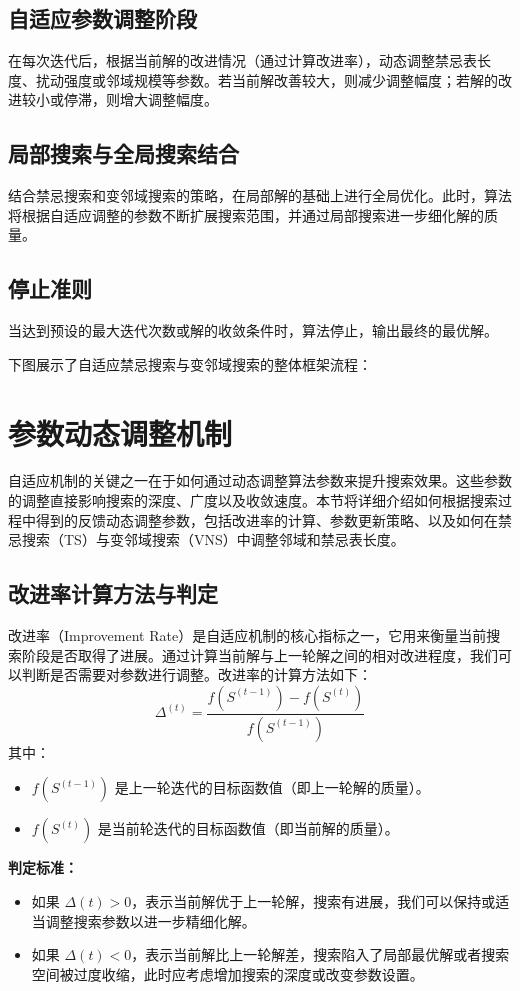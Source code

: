 \documentclass[12pt,a4paper,twoside]{ctexbook}
\begin{document}
\subsection{自适应参数调整阶段}
在每次迭代后，根据当前解的改进情况（通过计算改进率），动态调整禁忌表长度、扰动强度或邻域规模等参数。若当前解改善较大，则减少调整幅度；若解的改进较小或停滞，则增大调整幅度。

\subsection{局部搜索与全局搜索结合}
结合禁忌搜索和变邻域搜索的策略，在局部解的基础上进行全局优化。此时，算法将根据自适应调整的参数不断扩展搜索范围，并通过局部搜索进一步细化解的质量。

\subsection{停止准则}
当达到预设的最大迭代次数或解的收敛条件时，算法停止，输出最终的最优解。

下图展示了自适应禁忌搜索与变邻域搜索的整体框架流程：



\section{参数动态调整机制}
自适应机制的关键之一在于如何通过动态调整算法参数来提升搜索效果。这些参数的调整直接影响搜索的深度、广度以及收敛速度。本节将详细介绍如何根据搜索过程中得到的反馈动态调整参数，包括改进率的计算、参数更新策略、以及如何在禁忌搜索（TS）与变邻域搜索（VNS）中调整邻域和禁忌表长度。

\subsection{改进率计算方法与判定}
改进率（Improvement Rate）是自适应机制的核心指标之一，它用来衡量当前搜索阶段是否取得了进展。通过计算当前解与上一轮解之间的相对改进程度，我们可以判断是否需要对参数进行调整。改进率的计算方法如下：
\[
\Delta^{(t)} = \frac{f(S^{(t-1)}) - f(S^{(t)})}{f(S^{(t-1)})}
\]
其中：
\begin{itemize}
    \item $f(S^{(t-1)})$ 是上一轮迭代的目标函数值（即上一轮解的质量）。
    \item $f(S^{(t)})$ 是当前轮迭代的目标函数值（即当前解的质量）。
\end{itemize}

\textbf{判定标准：}
\begin{itemize}
    \item 如果 $\Delta(t) > 0$，表示当前解优于上一轮解，搜索有进展，我们可以保持或适当调整搜索参数以进一步精细化解。
    \item 如果 $\Delta(t) < 0$，表示当前解比上一轮解差，搜索陷入了局部最优解或者搜索空间被过度收缩，此时应考虑增加搜索的深度或改变参数设置。
\end{itemize}
\end{document}
